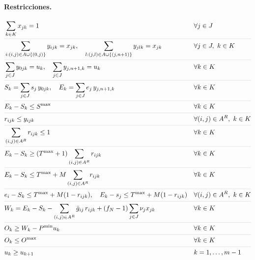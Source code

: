 \documentclass[letter, 10pt]{article}
\newcommand{\sepline}{\noalign{\vskip 3pt{\color{gray!40}\hrule height 0.4pt}\vskip 3pt}}
\begin{document}
\paragraph{Restricciones.}
\begin{align}
& \sum_{k\in K} x_{jk} = 1 && \forall j\in J \label{r:cob}\\ \sepline
& \sum_{i:(i,j)\in A\cup\{(0,j)\}} y_{ijk} = x_{jk},\quad \sum_{l:(j,l)\in A\cup\{(j,n+1)\}} y_{jlk} = x_{jk} && \forall j\in J,\ k\in K \label{r:flujo}\\ \sepline
& \sum_{j\in J} y_{0jk} = u_k,\quad \sum_{j\in J} y_{j,n+1,k} = u_k && \forall k\in K \label{r:uso}\\ \sepline
& S_k = \sum_{j\in J} s_j\, y_{0jk},\quad E_k=\sum_{j\in J} e_j\, y_{j,n+1,k} && \forall k\in K \label{r:ini}\\ \sepline
& E_k - S_k \leq S^{\max} && \forall k\in K \label{r:spread}\\ \sepline
& r_{ijk}\leq y_{ijk} && \forall (i,j)\in A^R,\ k\in K \label{r:rest1}\\ \sepline
& \sum_{(i,j)\in A^R} r_{ijk}\leq 1 && \forall k\in K \label{r:rest2}\\ \sepline
& E_k - S_k \geq (T^{\max}+1)\sum_{(i,j)\in A^R} r_{ijk} && \forall k\in K \label{r:restlargo}\\ \sepline
& E_k - S_k \leq T^{\max} + M\sum_{(i,j)\in A^R} r_{ijk} && \forall k\in K \label{r:sinrest}\\ \sepline
& e_i - S_k \leq T^{\max} + M(1-r_{ijk}),\quad E_k - s_j \leq T^{\max} + M(1-r_{ijk}) && \forall (i,j)\in A^R,\ k\in K \label{r:stretch}\\ \sepline
& W_k = E_k - S_k - \sum_{(i,j)\in A^R}\bar g_{ij}\, r_{ijk} + (f_N-1)\sum_{j\in J}\nu_j x_{jk} && \forall k\in K \label{r:trab}\\ \sepline
& O_k \geq W_k - P^{\min}u_k && \forall k\in K \label{r:ot}\\ \sepline
& O_k \leq O^{\max} && \forall k\in K \label{r:otmax}\\ \sepline
& u_k \geq u_{k+1} && k=1,\dots,m-1 \label{r:sim}
\end{align}
\end{document}
